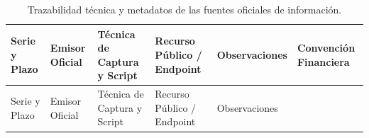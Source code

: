 \documentclass[
  10pt,
  letterpaper,
  DIV=11,
  numbers=noendperiod]{scrartcl}
\begin{document}
\begin{longtable}[]{@{}
  >{\raggedright\arraybackslash}p{}
  >{\raggedright\arraybackslash}p{}
  >{\raggedright\arraybackslash}p{}
  >{\raggedright\arraybackslash}p{}
  >{\centering\arraybackslash}p{}
  >{\raggedright\arraybackslash}p{}@{}}
\caption{Trazabilidad técnica y metadatos de las fuentes oficiales de
información.}\label{tbl-trazabilidad-fuentes}\tabularnewline
\toprule\noalign{}
\begin{minipage}[b]{\linewidth}\raggedright
Serie y Plazo
\end{minipage} & \begin{minipage}[b]{\linewidth}\raggedright
Emisor Oficial
\end{minipage} & \begin{minipage}[b]{\linewidth}\raggedright
Técnica de Captura y Script
\end{minipage} & \begin{minipage}[b]{\linewidth}\raggedright
Recurso Público / Endpoint
\end{minipage} & \begin{minipage}[b]{\linewidth}\centering
Observaciones
\end{minipage} & \begin{minipage}[b]{\linewidth}\raggedright
Convención Financiera
\end{minipage} \\
\midrule\noalign{}
\endfirsthead
\toprule\noalign{}
\begin{minipage}[b]{\linewidth}\raggedright
Serie y Plazo
\end{minipage} & \begin{minipage}[b]{\linewidth}\raggedright
Emisor Oficial
\end{minipage} & \begin{minipage}[b]{\linewidth}\raggedright
Técnica de Captura y Script
\end{minipage} & \begin{minipage}[b]{\linewidth}\raggedright
Recurso Público / Endpoint
\end{minipage} & \begin{minipage}[b]{\linewidth}\centering
Observaciones
\end{minipage} & \begin{minipage}[b]{\linewidth}\raggedright

\end{minipage}
\end{longtable}
\end{document}
